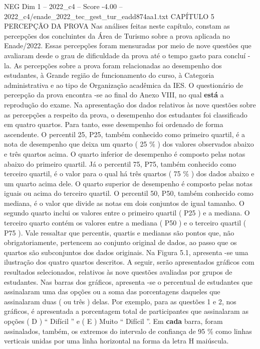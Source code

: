 \begin{textsample}{NEG Dim 1 – 2022\_c4 – Score -4.00 – 2022\_c4/enade\_2022\_tec\_gest\_tur\_eadd874aa1.txt}  \label{ex:f1_neg_172}
CAPÍTULO 5 PERCEPÇÃO DA PROVA Nas análises feitas neste capítulo, constam as percepções dos concluintes da Área de Turismo sobre a prova aplicada no Enade/2022.
Essas percepções foram mensuradas por meio de nove questões que avaliaram desde o grau de dificuldade da prova até o tempo gasto para concluí -la.
As percepções sobre a prova foram relacionadas ao desempenho dos estudantes, à Grande região de funcionamento do curso, à Categoria administrativa e ao tipo de Organização acadêmica da IES.
O questionário de percepção da prova encontra -se ao final do Anexo VIII, no qual \textbf{está} a reprodução do exame.
Na apresentação dos dados relativos às nove questões sobre as percepções a respeito da prova, o desempenho dos estudantes foi classificado em quatro quartos.
Para tanto, esse desempenho foi ordenado de forma ascendente.
O percentil 25, P25, também conhecido como primeiro quartil, é a nota de desempenho que deixa um quarto ( 25 \% ) dos valores observados abaixo e três quartos acima.
O quarto inferior de desempenho é composto pelas notas abaixo do primeiro quartil.
Já o percentil 75, P75, também conhecido como terceiro quartil, é o valor para o qual há três quartos ( 75 \% ) dos dados abaixo e um quarto acima dele.
O quarto superior de desempenho é composto pelas notas iguais ou acima do terceiro quartil.
O percentil 50, P50, também conhecido como mediana, é o valor que divide as notas em dois conjuntos de igual tamanho.
O segundo quarto inclui os valores entre o primeiro quartil ( P25 ) e a mediana.
O terceiro quarto contém os valores entre a mediana ( P50 ) e o terceiro quartil ( P75 ).
Vale ressaltar que percentis, quartis e medianas são pontos que, não obrigatoriamente, pertencem ao conjunto original de dados, ao passo que os quartos são subconjuntos dos dados originais.
Na Figura 5.1, apresenta -se uma ilustração dos quatro quartos descritos.
A seguir, serão apresentados gráficos com resultados selecionados, relativos às nove questões avaliadas por grupos de estudantes.
Nas barras dos gráficos, apresenta -se o percentual de estudantes que assinalaram uma das opções ou a soma das porcentagens daqueles que assinalaram duas ( ou três ) delas.
Por exemplo, para as questões 1 e 2, nos gráficos, é apresentada a porcentagem total de participantes que assinalaram as opções ( D ) “ Difícil ” e ( E ) Muito “ Difícil ”.
Em \textbf{cada} barra, foram assinalados, também, os extremos do intervalo de confiança de 95 \% como linhas verticais unidas por uma linha horizontal na forma da letra H maiúscula.

\end{textsample}
